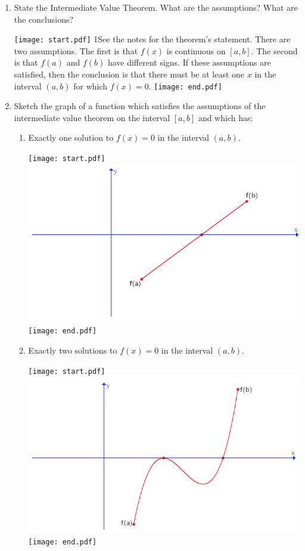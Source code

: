 \documentclass[12pt]{article}
\begin{document}
\begin{enumerate}

\item State the Intermediate Value Theorem.  What are the assumptions?  What are the conclusions?

\texttt{[image: start.pdf]}
{{{1\linewidth}{See the notes for the theorem's statement. There are two assumptions.  The first is that $f(x)$ is continuous on $[a,b]$.  The second is that $f(a)$ and $f(b)$ have different signs.  If these assumptions are satisfied, then the conclusion is that there must be at least one $x$ in the interval $(a,b)$ for which $f(x)=0$.}}}
\texttt{[image: end.pdf]}


\item Sketch the graph of a function which satisfies the assumptions of the intermediate value theorem on the interval $[a,b]$ and which has:

\begin{enumerate}

\item Exactly one solution to $f(x)=0$ in the interval $(a,b)$.

\texttt{[image: start.pdf]}
{{\includegraphics[scale=0.7]{graph3.png}}}
\texttt{[image: end.pdf]}


\item Exactly two solutions to $f(x)=0$ in the interval $(a,b)$.

\texttt{[image: start.pdf]}
{{\includegraphics[scale=0.7]{graph2.png}}}
\texttt{[image: end.pdf]}



\end{enumerate}
\end{enumerate}
\end{document}
